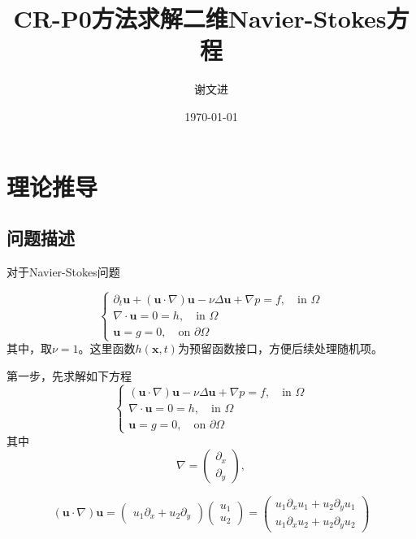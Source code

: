 \documentclass{ctexart}
\title{CR-P0方法求解二维Navier-Stokes方程}
\author{谢文进}
\date{\today}
\begin{document}
\maketitle
\section{理论推导}
\subsection{问题描述}
对于Navier-Stokes问题

\begin{equation}
    \label{NavierStokes}
    \left\{\begin{matrix}
        \partial_t\mathbf{u} + (\mathbf{u} \cdot \nabla)\mathbf{u}    - 
\nu \Delta \mathbf{u}  + \nabla p = f, \quad \text{in } \Omega\\ 
        \nabla \cdot \mathbf{u} = 0 = h, \quad \text{in } \Omega \\
        \mathbf{u} = g = 0, \quad \text{on } \partial \Omega
\end{matrix}\right.
\end{equation}
其中，取$\nu = 1$。这里函数$h(\mathbf{x},t)$为预留函数接口，方便后续处理随机项。

第一步，先求解如下方程
\begin{equation}
    \label{NavierStokes01}
    \left\{\begin{matrix}
        (\mathbf{u} \cdot \nabla)\mathbf{u}    - 
 \nu \Delta \mathbf{u}  + \nabla p = f, \quad \text{in } \Omega\\ 
         \nabla \cdot \mathbf{u} = 0 = h, \quad \text{in } \Omega \\
         \mathbf{u} = g = 0, \quad \text{on } \partial \Omega
 \end{matrix}\right.
\end{equation}
其中
$$
\nabla = \begin{pmatrix}
    \partial _x\\
   \partial _y
   \end{pmatrix},
$$

$$
(\mathbf{u} \cdot \nabla)\mathbf{u} = \begin{pmatrix}
    u_1 \partial _x + u_2 \partial _y
    \end{pmatrix}
    \begin{pmatrix}
     u_1\\
    u_2
    \end{pmatrix}
    =\begin{pmatrix}
     u_1\partial _xu_1+u_2\partial _yu_1\\
     u_1\partial _xu_2+u_2\partial _yu_2
    \end{pmatrix}
$$
\end{document}
